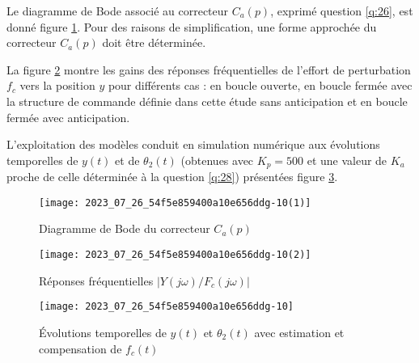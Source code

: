 
Le diagramme de Bode associé au correcteur $C_{a}(p)$, exprimé question \ref{q:26}, est donné figure \ref{fig:16}. Pour des raisons de simplification, une forme approchée du correcteur $C_{a}(p)$ doit être déterminée.


La figure \ref{fig:17} montre les gains des réponses fréquentielles de l'effort de perturbation $f_{c}$ vers la position $y$ pour différents cas : en boucle ouverte, en boucle fermée avec la structure de commande définie dans cette étude sans anticipation et en boucle fermée avec anticipation.

L'exploitation des modèles conduit en simulation numérique aux évolutions temporelles de $y(t)$ et de $\theta_{2}(t)$ (obtenues avec $K_{p}=500$ et une valeur de $K_{a}$ proche de celle déterminée à la question \ref{q:28}) présentées figure \ref{fig:18}. 


\begin{figure}[!h]
\centering
\texttt{[image: 2023\_07\_26\_54f5e859400a10e656ddg-10(1)]}
\caption{\label{fig:16}Diagramme de Bode du correcteur $C_{a}(p)$}
\end{figure}


\begin{figure}[!h]
\centering
\texttt{[image: 2023\_07\_26\_54f5e859400a10e656ddg-10(2)]}
\caption{\label{fig:17}Réponses fréquentielles $\left|Y(j \omega) / F_{c}(j \omega)\right|$}
\end{figure}


\begin{figure}[!h]
\centering
\texttt{[image: 2023\_07\_26\_54f5e859400a10e656ddg-10]}
\caption{\label{fig:18}Évolutions temporelles de $y(t)$ et $\theta_{2}(t)$ avec estimation et compensation de $f_{c}(t)$}
\end{figure}

%